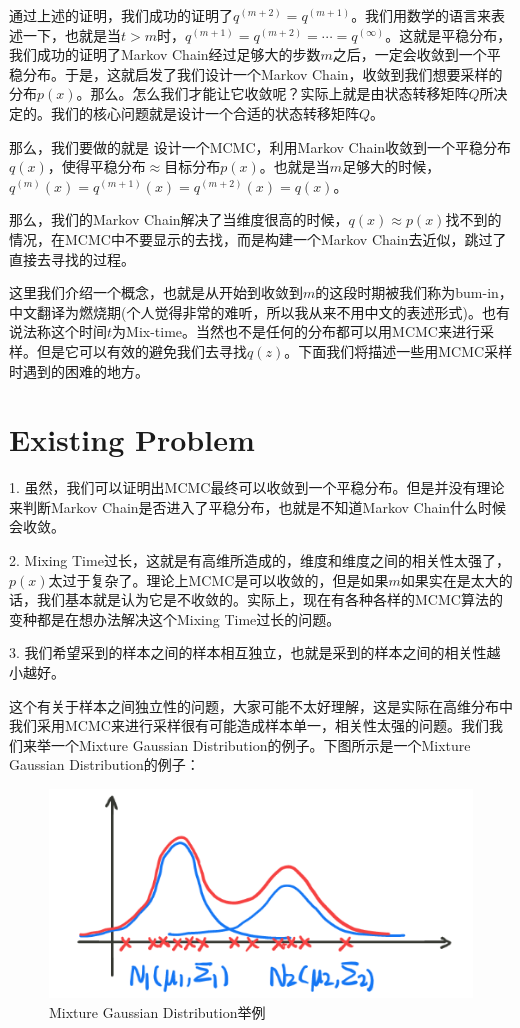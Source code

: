 \documentclass[a4paper]{article}
\begin{document}
通过上述的证明，我们成功的证明了$q^{(m+2)} = q^{(m+1)}$。我们用数学的语言来表述一下，也就是当$t > m$时，$q^{(m+1)} = q^{(m+2)} = \cdots = q^{(\infty)}$。这就是平稳分布，我们成功的证明了Markov Chain经过足够大的步数$m$之后，一定会收敛到一个平稳分布。于是，这就启发了我们设计一个Markov Chain，收敛到我们想要采样的分布$p(x)$。那么。怎么我们才能让它收敛呢？实际上就是由状态转移矩阵$Q$所决定的。我们的核心问题就是设计一个合适的状态转移矩阵$Q$。

那么，我们要做的就是{\color{red} 设计一个MCMC，利用Markov Chain收敛到一个平稳分布$q(x)$，使得平稳分布$\approx$目标分布$p(x)$。}也就是当$m$足够大的时候，$q^{(m)}(x) = q^{(m+1)}(x) = q^{(m+2)}(x) = q(x)$。

那么，我们的Markov Chain解决了当维度很高的时候，$q(x) \approx p(x)$找不到的情况，在MCMC中不要显示的去找，而是构建一个Markov Chain去近似，跳过了直接去寻找的过程。

这里我们介绍一个概念，也就是从开始到收敛到$m$的这段时期被我们称为bum-in，中文翻译为燃烧期(个人觉得非常的难听，所以我从来不用中文的表述形式)。也有说法称这个时间$t$为Mix-time。当然也不是任何的分布都可以用MCMC来进行采样。但是它可以有效的避免我们去寻找$q(z)$。下面我们将描述一些用MCMC采样时遇到的困难的地方。

\section{Existing Problem}
1. 虽然，我们可以证明出MCMC最终可以收敛到一个平稳分布。但是并没有理论来判断Markov Chain是否进入了平稳分布，也就是不知道Markov Chain什么时候会收敛。

2. Mixing Time过长，这就是有高维所造成的，维度和维度之间的相关性太强了，$p(x)$太过于复杂了。理论上MCMC是可以收敛的，但是如果$m$如果实在是太大的话，我们基本就是认为它是不收敛的。实际上，现在有各种各样的MCMC算法的变种都是在想办法解决这个Mixing Time过长的问题。

3. 我们希望采到的样本之间的样本相互独立，也就是采到的样本之间的相关性越小越好。

这个有关于样本之间独立性的问题，大家可能不太好理解，这是实际在高维分布中我们采用MCMC来进行采样很有可能造成样本单一，相关性太强的问题。我们我们来举一个Mixture Gaussian Distribution的例子。下图所示是一个Mixture Gaussian Distribution的例子：
\begin{figure}[H]
    \centering
    \includegraphics[width=.55\textwidth]{微信图片_20200103152759.png}
    \caption{Mixture Gaussian Distribution举例}
    \label{fig:my_label_1}
\end{figure}
\end{document}
